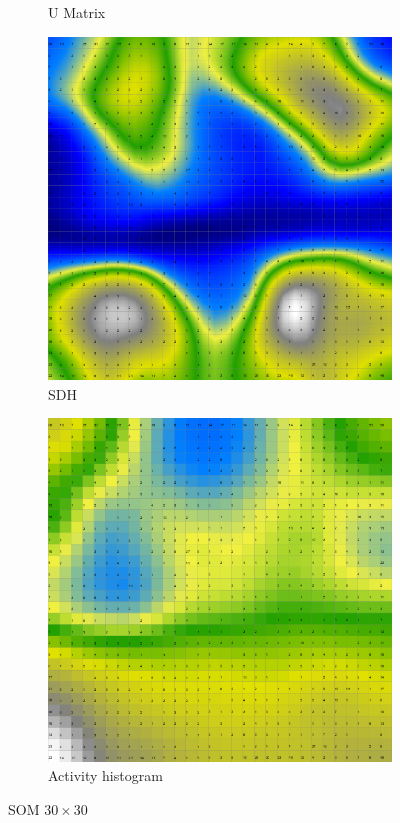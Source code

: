 \documentclass{acm_proc_article-sp}
\begin{document}
\begin{figure}
\begin{subfigure}[b]{0.45\linewidth}
    \caption{U Matrix}
    \label{fig:wine-big-u-matrix}
\end{subfigure}
\begin{subfigure}[b]{0.45\linewidth}
    \includegraphics[width=\linewidth]{img/wine-big-smoothed-data-histogram}
    \caption{SDH}
    \label{fig:wine-big-smoothed-data-histogram}
\end{subfigure}
\begin{subfigure}[b]{0.45\linewidth}
    \includegraphics[width=\linewidth]{img/wine-big-activity-histogram}
    \caption{Activity histogram}
    \label{fig:wine-big-activity-histogram}
\end{subfigure}
\caption{SOM $30\times30$}
\end{figure}
\end{document}
